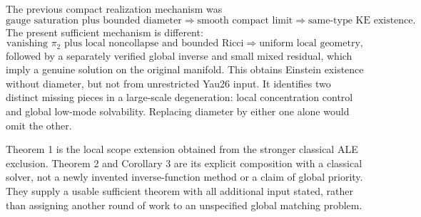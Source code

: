 \documentclass[
  11pt,
]{article}
\begin{document}
The previous compact realization mechanism was \[
 \text{gauge saturation plus bounded diameter}
 \Longrightarrow\text{smooth compact limit}
 \Longrightarrow\text{same-type KE existence}.
\] The present sufficient mechanism is different: \[
 \text{vanishing }\pi_2\text{ plus local noncollapse and bounded Ricci}
 \Longrightarrow\text{uniform local geometry},
\] followed by a separately verified global inverse and small mixed
residual, which imply a genuine solution on the original manifold. This
obtains Einstein existence without diameter, but not from unrestricted
Yau26 input. It identifies two distinct missing pieces in a large-scale
degeneration: local concentration control and global low-mode
solvability. Replacing diameter by either one alone would omit the
other.

Theorem 1 is the local scope extension obtained from the stronger
classical ALE exclusion. Theorem 2 and Corollary 3 are its explicit
composition with a classical solver, not a newly invented
inverse-function method or a claim of global priority. They supply a
usable sufficient theorem with all additional input stated, rather than
assigning another round of work to an unspecified global matching
problem.
\end{document}
